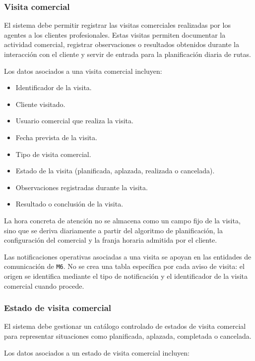 \subsubsection*{Visita comercial}

El sistema debe permitir registrar las visitas comerciales realizadas por los agentes a los clientes profesionales. Estas visitas permiten documentar la actividad comercial, registrar observaciones o resultados obtenidos durante la interacción con el cliente y servir de entrada para la planificación diaria de rutas.

Los datos asociados a una visita comercial incluyen:

\begin{itemize}
    \item Identificador de la visita.
    \item Cliente visitado.
    \item Usuario comercial que realiza la visita.
    \item Fecha prevista de la visita.
    \item Tipo de visita comercial.
    \item Estado de la visita (planificada, aplazada, realizada o cancelada).
    \item Observaciones registradas durante la visita.
    \item Resultado o conclusión de la visita.
\end{itemize}

La hora concreta de atención no se almacena como un campo fijo de la visita, sino que se deriva diariamente a partir del algoritmo de planificación, la configuración del comercial y la franja horaria admitida por el cliente.

Las notificaciones operativas asociadas a una visita se apoyan en las entidades de comunicación de \texttt{M6}. No se crea una tabla específica por cada aviso de visita: el origen se identifica mediante el tipo de notificación y el identificador de la visita comercial cuando procede.

\subsubsection*{Estado de visita comercial}

El sistema debe gestionar un catálogo controlado de estados de visita comercial para representar situaciones como planificada, aplazada, completada o cancelada.

Los datos asociados a un estado de visita comercial incluyen:

